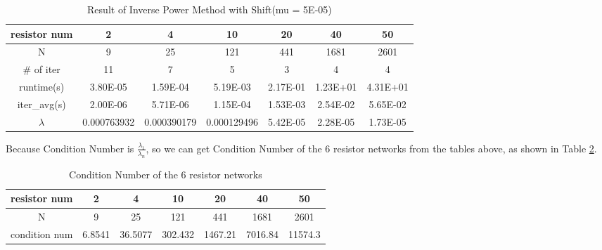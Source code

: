 \documentclass{article}
\begin{document}
\begin{table}[H]
    \begin{center}
        \begin{tabular}{|c|c|c|c|c|c|c|}
            \hline
            resistor num & 2 & 4 & 10 & 20 & 40 & 50 \\ \hline
            N & 9 & 25 & 121 & 441 & 1681 & 2601 \\ \hline
            \# of iter & 11 & 7 & 5 & 3 & 4 & 4 \\ \hline
            runtime(s) & 3.80E-05 & 1.59E-04 & 5.19E-03 & 2.17E-01 & 1.23E+01 & 4.31E+01 \\ \hline
            iter\_avg(s) & 2.00E-06 & 5.71E-06 & 1.15E-04 & 1.53E-03 & 2.54E-02 & 5.65E-02 \\ \hline
            $\lambda$ & 0.000763932 & 0.000390179 & 0.000129496 & 5.42E-05 & 2.28E-05 & 1.73E-05 \\ \hline
        \end{tabular}
    \end{center}
    \caption{Result of Inverse Power Method with Shift(mu = 5E-05)}
    \label{tab:ipwrsht}
\end{table}
Because Condition Number is $\frac{\lambda_1}{\lambda_n}$, so we can get Condition Number of the 6 resistor networks from the tables above,
as shown in Table \ref{tab:condition number}.
\begin{table}[htbp]
    \begin{center}
        \begin{tabular}{|c|c|c|c|c|c|c|}
            \hline
            resistor num & 2 & 4 & 10 & 20 & 40 & 50 \\ \hline
            N & 9 & 25 & 121 & 441 & 1681 & 2601 \\ \hline
            condition num & 6.8541 & 36.5077 & 302.432 & 1467.21 & 7016.84 & 11574.3 \\ \hline
        \end{tabular}
    \end{center}
    \caption{Condition Number of the 6 resistor networks}
    \label{tab:condition number}
\end{table}
\end{document}
